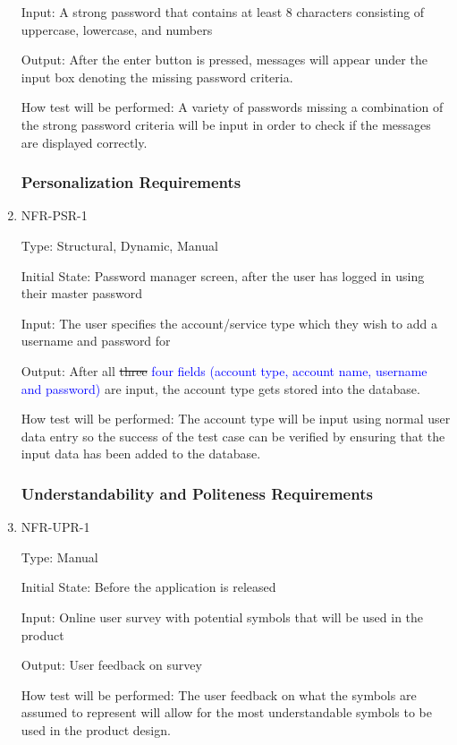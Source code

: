 \documentclass[12pt, titlepage]{article}
\begin{document}
\begin{enumerate}
Input: A strong password that contains at least 8 characters consisting of uppercase, lowercase, and numbers

Output: After the enter button is pressed, messages will appear under the input box denoting the missing password criteria.

How test will be performed: A variety of passwords missing a combination of the strong password criteria will be input in order to check if the messages are displayed correctly.

\subsubsection{Personalization Requirements}

\item{NFR-PSR-1\\}

Type: Structural, Dynamic, Manual

Initial State: Password manager screen, after the user has logged in using their master password

Input: The user specifies the account/service type which they wish to add a username and password for

Output: After all \sout{three} \textcolor{blue}{four fields (account type, account name, username and password)} are input, the account type gets stored into the database.

How test will be performed: The account type will be input using normal user data entry so the success of the test case can be verified by ensuring that the input data has been added to the database.

\subsubsection{Understandability and Politeness Requirements}

\item{NFR-UPR-1\\}

Type: Manual

Initial State: Before the application is released

Input: Online user survey with potential symbols that will be used in the product

Output: User feedback on survey

How test will be performed: The user feedback on what the symbols are assumed to represent will allow for the most understandable symbols to be used in the product design.


\end{enumerate}
\end{document}
